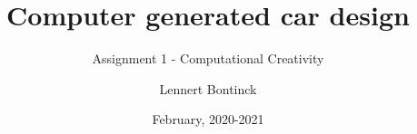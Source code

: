 \title{Computer generated car design}
\subtitle{Assignment 1 - Computational Creativity}
\author{Lennert Bontinck}
\date{February, 2020-2021}

